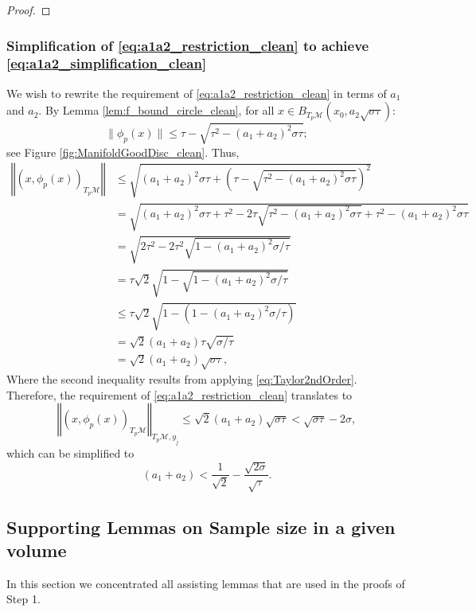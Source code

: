 \documentclass[12pt]{article}
\theoremstyle{remark}
\newcommand{\MM}{\mathcal{M}}
\newcommand{\norm}[1]{\left\Vert #1 \right\Vert}
\begin{document}
\begin{appendices}
\begin{proof}
\end{proof}


\subsubsection{Simplification of \eqref{eq:a1a2_restriction_clean} to achieve \eqref{eq:a1a2_simplification_clean}}\label{subsec:simplification_app}
We wish to rewrite the requirement of \eqref{eq:a1a2_restriction_clean} in terms of $a_1$ and $a_2$.
By Lemma \ref{lem:f_bound_circle_clean}, for all $x\in B_{T_p\MM}(x_0, a_2 \sqrt{\sigma\tau})$:
\begin{equation*}
    \|\phi_p(x)\| \leq \tau - \sqrt{\tau^2 - (a_1+a_2)^2 {\sigma\tau}} 
;\end{equation*}
see Figure \ref{fig:ManifoldGoodDisc_clean}.
Thus,
\begin{align*}
\norm{(x,\phi_p(x))_{T_p\MM}}
& \leq \sqrt{(a_1+a_2)^2 {\sigma\tau} + \left(\tau - \sqrt{\tau^2 - (a_1+a_2)^2 {\sigma\tau}}\right)^2} \\
&= \sqrt{(a_1+a_2)^2{\sigma\tau} + \tau^2 - 2\tau\sqrt{\tau^2 - (a_1+a_2)^2 {\sigma\tau}} + \tau^2 - (a_1+a_2)^2 {\sigma\tau}} \\
&= \sqrt{2\tau^2 - 2\tau^2\sqrt{1 - (a_1+a_2)^2 {\sigma/\tau}} } \\
&= \tau\sqrt{2} \sqrt{1 - \sqrt{1 - (a_1+a_2)^2 {\sigma/\tau}} } \\
&\leq \tau\sqrt{2} \sqrt{1 - (1 - (a_1+a_2)^2 {\sigma/\tau}) } \\
&= \sqrt{2}(a_1+a_2) \tau\sqrt{ {\sigma/\tau} } \\
&= \sqrt{2}(a_1+a_2) \sqrt{ {\sigma\tau} },\end{align*}
Where the second inequality results from applying \eqref{eq:Taylor2ndOrder}.
Therefore, the requirement of \eqref{eq:a1a2_restriction_clean} translates to
$$
\norm{(x,\phi_p(x))_{T_p\MM}}_{T_p\MM,y_{\tilde j}}\leq \sqrt{2}(a_1+a_2)\sqrt{\sigma\tau}<\sqrt{\sigma\tau}-2\sigma
,$$
which can be simplified to 
$$
(a_1+a_2)<\frac{1}{\sqrt{2}} - \frac{\sqrt{2\sigma}}{\sqrt{\tau}} 
.$$


\subsection{Supporting Lemmas on Sample size in a given volume}
In this section we concentrated all assisting lemmas that are used in the proofs of Step 1.


\end{appendices}
\end{document}
